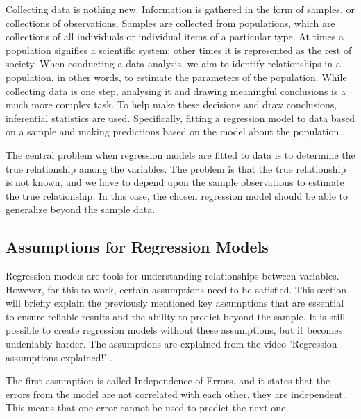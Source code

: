 Collecting data is nothing new. Information is gathered in the form of samples, or collections of observations. Samples are collected from populations, which are collections of all individuals or individual items of a particular type. At times a population signifies a scientific system; other times it is represented as the rest of society. When conducting a data analysis, we aim to identify relationships in a population, in other words, to estimate the parameters of the population. While collecting data is one step, analysing it and drawing meaningful conclusions is a much more complex task. To help make these decisions and draw conclusions, inferential statistics are used.  Specifically, fitting a regression model to data based on a sample and making predictions based on the model about the population \cite{ProbAndStat}. \newline


\noindent The central problem when regression models are fitted to data is to determine the true relationship among the variables. The problem is that the true relationship is not known, and we have to depend upon the sample observations to estimate the true relationship. In this case, the chosen regression model should be able to generalize beyond the sample data. \newline 



\subsection{Assumptions for Regression Models}

\noindent Regression models are tools for understanding relationships between variables. However, for this to work, certain assumptions need to be satisfied. This section will briefly explain the previously mentioned key assumptions that are essential to ensure reliable results and the ability to predict beyond the sample. It is still possible to create regression models without these assumptions, but it becomes undeniably harder. The assumptions are explained from the video 'Regression assumptions explained!' \cite{Assumptions}.  \newline

\noindent The first assumption is called Independence of Errors, and it states that the errors from the model are not correlated with each other, they are independent. This means that one error cannot be used to predict the next one. \newline


